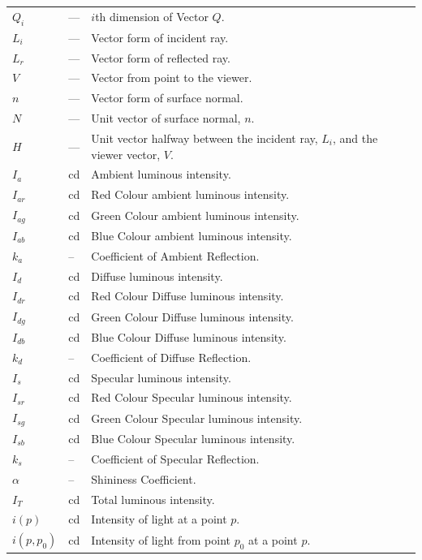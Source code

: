 \documentclass[12pt]{article}
\begin{document}
\begin{longtable*}{l l p{12cm}}
	\\
	$Q_{i}$ & --- & $i$th dimension of Vector $Q$.
	\\
	$L_{i}$ & --- & Vector form of incident ray.
	\\
	$L_{r}$ & --- & Vector form of reflected ray.
	\\
	$V$ & --- & Vector from point to the viewer.
	\\
	$n$ & --- & Vector form of surface normal.
	\\
	$N$ & --- & Unit vector of surface normal, $n$.
	\\
	$H$ & --- & Unit vector halfway between the incident ray, $L_{i}$, and
	the viewer vector, $V$.
	\\
	$I_{a}$ & cd & Ambient luminous intensity.
	\\
	$I_{ar}$ & cd & Red Colour ambient luminous intensity.
	\\
	$I_{ag}$ & cd & Green Colour ambient luminous intensity.
	\\
	$I_{ab}$ & cd & Blue Colour ambient luminous intensity.
	\\
	$k_{a}$ & -- & Coefficient of Ambient Reflection.
	\\
	$I_{d}$ & cd & Diffuse luminous intensity.
	\\
	$I_{dr}$ & cd & Red Colour Diffuse luminous intensity.
	\\
	$I_{dg}$ & cd & Green Colour Diffuse luminous intensity.
	\\
	$I_{db}$ & cd & Blue Colour Diffuse luminous intensity.
	\\
	$k_{d}$ & -- & Coefficient of Diffuse Reflection.
	\\
	$I_{s}$ & cd & Specular luminous intensity.
	\\
	$I_{sr}$ & cd & Red Colour Specular luminous intensity.
	\\
	$I_{sg}$ & cd & Green Colour Specular luminous intensity.
	\\
	$I_{sb}$ & cd & Blue Colour Specular luminous intensity.
	\\
	$k_{s}$ & -- & Coefficient of Specular Reflection.
	\\
	$\alpha$ & -- & Shininess Coefficient.
	\\
	$I_{T}$ & cd & Total luminous intensity.
	\\
	$i(p)$ & cd & Intensity of light at a point $p$.
	\\
	$i(p, p_{0})$ & cd & Intensity of light from point $p_{0}$ at a point $p$.
	\\
	\bottomrule
\end{longtable*}
\end{document}
